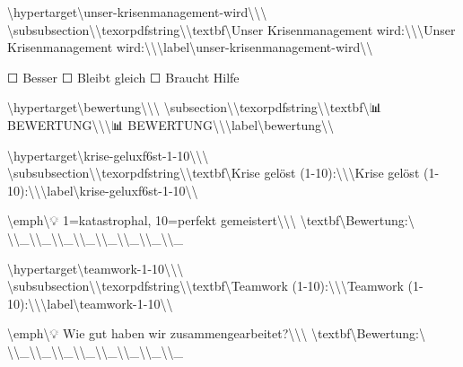 \textbackslash{}hypertarget\textbackslash{}{unser-krisenmanagement-wird\textbackslash{}}\textbackslash{}{\textbackslash{}%
\textbackslash{}subsubsection\textbackslash{}{\textbackslash{}texorpdfstring\textbackslash{}{\textbackslash{}textbf\textbackslash{}{Unser Krisenmanagement wird:\textbackslash{}}\textbackslash{}}\textbackslash{}{Unser Krisenmanagement wird:\textbackslash{}}\textbackslash{}}\textbackslash{}label\textbackslash{}{unser-krisenmanagement-wird\textbackslash{}}\textbackslash{}}

☐ Besser ☐ Bleibt gleich ☐ Braucht Hilfe

\textbackslash{}hypertarget\textbackslash{}{bewertung\textbackslash{}}\textbackslash{}{\textbackslash{}%
\textbackslash{}subsection\textbackslash{}{\textbackslash{}texorpdfstring\textbackslash{}{\textbackslash{}textbf\textbackslash{}{📊 BEWERTUNG\textbackslash{}}\textbackslash{}}\textbackslash{}{📊 BEWERTUNG\textbackslash{}}\textbackslash{}}\textbackslash{}label\textbackslash{}{bewertung\textbackslash{}}\textbackslash{}}

\textbackslash{}hypertarget\textbackslash{}{krise-geluxf6st-1-10\textbackslash{}}\textbackslash{}{\textbackslash{}%
\textbackslash{}subsubsection\textbackslash{}{\textbackslash{}texorpdfstring\textbackslash{}{\textbackslash{}textbf\textbackslash{}{Krise gelöst (1-10):\textbackslash{}}\textbackslash{}}\textbackslash{}{Krise gelöst (1-10):\textbackslash{}}\textbackslash{}}\textbackslash{}label\textbackslash{}{krise-geluxf6st-1-10\textbackslash{}}\textbackslash{}}

\textbackslash{}emph\textbackslash{}{💡 1=katastrophal, 10=perfekt gemeistert\textbackslash{}}\textbackslash{}\textbackslash{}
\textbackslash{}textbf\textbackslash{}{Bewertung:\textbackslash{}} \textbackslash{}\textbackslash{}_\textbackslash{}\textbackslash{}_\textbackslash{}\textbackslash{}_\textbackslash{}\textbackslash{}_\textbackslash{}\textbackslash{}_\textbackslash{}\textbackslash{}_\textbackslash{}\textbackslash{}_\textbackslash{}\textbackslash{}_

\textbackslash{}hypertarget\textbackslash{}{teamwork-1-10\textbackslash{}}\textbackslash{}{\textbackslash{}%
\textbackslash{}subsubsection\textbackslash{}{\textbackslash{}texorpdfstring\textbackslash{}{\textbackslash{}textbf\textbackslash{}{Teamwork (1-10):\textbackslash{}}\textbackslash{}}\textbackslash{}{Teamwork (1-10):\textbackslash{}}\textbackslash{}}\textbackslash{}label\textbackslash{}{teamwork-1-10\textbackslash{}}\textbackslash{}}

\textbackslash{}emph\textbackslash{}{💡 Wie gut haben wir zusammengearbeitet?\textbackslash{}}\textbackslash{}\textbackslash{}
\textbackslash{}textbf\textbackslash{}{Bewertung:\textbackslash{}} \textbackslash{}\textbackslash{}_\textbackslash{}\textbackslash{}_\textbackslash{}\textbackslash{}_\textbackslash{}\textbackslash{}_\textbackslash{}\textbackslash{}_\textbackslash{}\textbackslash{}_\textbackslash{}\textbackslash{}_\textbackslash{}\textbackslash{}_

